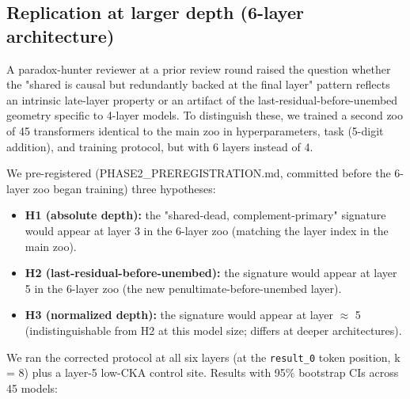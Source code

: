 \subsection{Replication at larger depth (6-layer architecture)}

A paradox-hunter reviewer at a prior review round raised the question
whether the "shared is causal but redundantly backed at the final
layer" pattern reflects an intrinsic late-layer property or an artifact
of the last-residual-before-unembed geometry specific to 4-layer models.
To distinguish these, we trained a second zoo of 45 transformers
identical to the main zoo in hyperparameters, task (5-digit addition),
and training protocol, but with 6 layers instead of 4.

We pre-registered (PHASE2\_PREREGISTRATION.md, committed before the
6-layer zoo began training) three hypotheses:

\begin{itemize}
  \item \textbf{H1 (absolute depth):} the "shared-dead, complement-primary" signature would appear at layer 3 in the 6-layer zoo (matching the layer index in the main zoo).
  \item \textbf{H2 (last-residual-before-unembed):} the signature would appear at layer 5 in the 6-layer zoo (the new penultimate-before-unembed layer).
  \item \textbf{H3 (normalized depth):} the signature would appear at layer $\approx$ 5 (indistinguishable from H2 at this model size; differs at deeper architectures).
\end{itemize}

We ran the corrected protocol at all six layers (at the \texttt{result\_0}
token position, k = 8) plus a layer-5 low-CKA control site. Results
with 95\% bootstrap CIs across 45 models:

